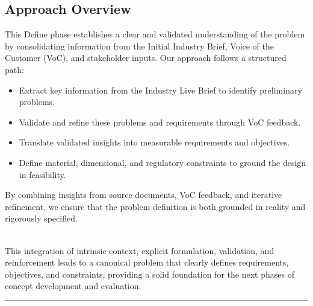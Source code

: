 \documentclass{report}
\begin{document}
\begin{minipage}{0.57\textwidth}
	\subsection{Approach Overview}
	This Define phase establishes a clear and validated understanding of the problem by consolidating information from the Initial Industry Brief, Voice of the Customer (VoC), and stakeholder inputs. Our approach follows a structured path:\\[0.1em]
	\begin{itemize}[itemsep=1mm]
		\item Extract key information from the Industry Live Brief to identify preliminary problems.
		\item Validate and refine these problems and requirements through VoC feedback.
		\item Translate validated insights into measurable requirements and objectives.
		\item Define material, dimensional, and regulatory constraints to ground the design in feasibility.
	\end{itemize}\vspace{1em}
	By combining insights from source documents, VoC feedback, and iterative refinement, we ensure that the problem definition is both grounded in reality and rigorously specified.
\end{minipage}\\[1em]
 This integration of intrinsic context, explicit formulation, validation, and reinforcement leads to a canonical problem that clearly defines requirements, objectives, and constraints, providing a solid foundation for the next phases of concept development and evaluation.\\[2em]
\hrule\vspace{0.3em}
\end{document}
